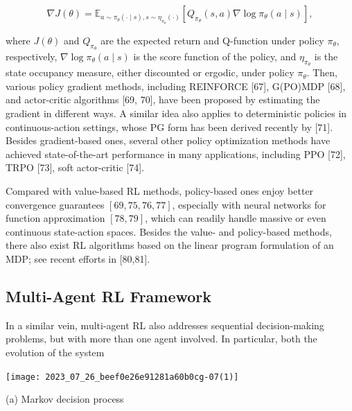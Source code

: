 \documentclass[10pt]{article}
\begin{document}
\[
\nabla J(\theta)=\mathbb{E}_{a \sim \pi_{\theta}(\cdot \mid s), s \sim \eta_{\pi_{\theta}}(\cdot)}\left[Q_{\pi_{\theta}}(s, a) \nabla \log \pi_{\theta}(a \mid s)\right],
\]

where $J(\theta)$ and $Q_{\pi_{\theta}}$ are the expected return and Q-function under policy $\pi_{\theta}$, respectively, $\nabla \log \pi_{\theta}(a \mid s)$ is the score function of the policy, and $\eta_{\pi_{\theta}}$ is the state occupancy measure, either discounted or ergodic, under policy $\pi_{\theta}$. Then, various policy gradient methods, including REINFORCE [67], G(PO)MDP [68], and actor-critic algorithms [69, 70], have been proposed by estimating the gradient in different ways. A similar idea also applies to deterministic policies in continuous-action settings, whose PG form has been derived recently by [71]. Besides gradient-based ones, several other policy optimization methods have achieved state-of-the-art performance in many applications, including PPO [72], TRPO [73], soft actor-critic [74].

Compared with value-based RL methods, policy-based ones enjoy better convergence guarantees $[69,75,76,77]$, especially with neural networks for function approximation $[78,79]$, which can readily handle massive or even continuous state-action spaces. Besides the value- and policy-based methods, there also exist RL algorithms based on the linear program formulation of an MDP; see recent efforts in [80,81].

\subsection{Multi-Agent RL Framework}
In a similar vein, multi-agent RL also addresses sequential decision-making problems, but with more than one agent involved. In particular, both the evolution of the system

\begin{center}
\texttt{[image: 2023\_07\_26\_beef0e26e91281a60b0cg-07(1)]}
\end{center}

(a) Markov decision process
\end{document}
